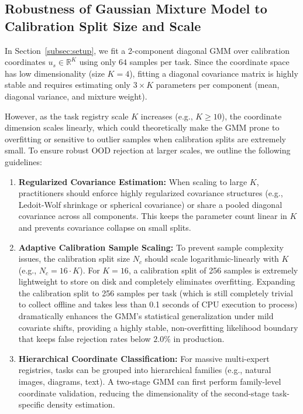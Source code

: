 \documentclass{article}
\theoremstyle{plain}
\theoremstyle{definition}
\theoremstyle{remark}
\begin{document}
\subsection{Robustness of Gaussian Mixture Model to Calibration Split Size and Scale}
\label{subsec:appendix_gmm}
In Section~\ref{subsec:setup}, we fit a 2-component diagonal GMM over calibration coordinates $u_s \in \mathbb{R}^K$ using only $64$ samples per task. Since the coordinate space has low dimensionality (size $K=4$), fitting a diagonal covariance matrix is highly stable and requires estimating only $3 \times K$ parameters per component (mean, diagonal variance, and mixture weight).

However, as the task registry scale $K$ increases (e.g., $K \ge 10$), the coordinate dimension scales linearly, which could theoretically make the GMM prone to overfitting or sensitive to outlier samples when calibration splits are extremely small. To ensure robust OOD rejection at larger scales, we outline the following guidelines:
\begin{enumerate}
    \item \textbf{Regularized Covariance Estimation:} When scaling to large $K$, practitioners should enforce highly regularized covariance structures (e.g., Ledoit-Wolf shrinkage or spherical covariance) or share a pooled diagonal covariance across all components. This keeps the parameter count linear in $K$ and prevents covariance collapse on small splits.
    \item \textbf{Adaptive Calibration Sample Scaling:} To prevent sample complexity issues, the calibration split size $N_c$ should scale logarithmic-linearly with $K$ (e.g., $N_c = 16 \cdot K$). For $K=16$, a calibration split of 256 samples is extremely lightweight to store on disk and completely eliminates overfitting. Expanding the calibration split to 256 samples per task (which is still completely trivial to collect offline and takes less than 0.1 seconds of CPU execution to process) dramatically enhances the GMM's statistical generalization under mild covariate shifts, providing a highly stable, non-overfitting likelihood boundary that keeps false rejection rates below $2.0\%$ in production.
    \item \textbf{Hierarchical Coordinate Classification:} For massive multi-expert registries, tasks can be grouped into hierarchical families (e.g., natural images, diagrams, text). A two-stage GMM can first perform family-level coordinate validation, reducing the dimensionality of the second-stage task-specific density estimation.
\end{enumerate}
\end{document}

